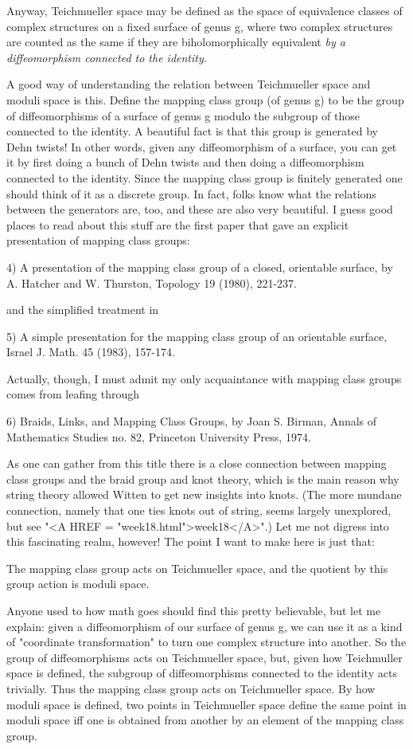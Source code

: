 Anyway, Teichmueller space may be defined as the space of equivalence
classes of complex structures on a fixed surface of genus g, where two
complex structures are counted as the same if they are biholomorphically
equivalent \emph{by a diffeomorphism connected to the identity}.  

A good way of understanding the relation between Teichmueller space and
moduli space is this.  Define the mapping class group (of genus g) to be
the group of diffeomorphisms of a surface of genus g modulo the subgroup
of those connected to the identity.     A beautiful fact is that this
group is generated by Dehn twists!  In other words, given any
diffeomorphism of a surface, you can get it by first doing a bunch of
Dehn twists and then doing a diffeomorphism connected to the identity.  
Since the mapping class group is finitely generated one should think of
it as a discrete group.  In fact, folks know what the relations between
the generators are, too, and these are also very beautiful.  I guess
good places to read about this stuff are the first paper that gave an
explicit presentation of mapping class groups:

4) A presentation of the mapping class group of a closed, orientable
surface, by A. Hatcher and W. Thurston, Topology 19 (1980), 221-237.

and the simplified treatment in 

5) A simple presentation for the mapping class group of an orientable
surface, Israel J. Math. 45 (1983), 157-174.

Actually, though, I must admit my only acquaintance with mapping class
groups comes from leafing through

6) Braids, Links, and Mapping Class Groups, by Joan S. Birman, Annals of
Mathematics Studies no. 82, Princeton University Press, 1974. 

As one can gather from this title there is a close connection between
mapping class groups and the braid group and knot theory, which is the
main reason why string theory allowed Witten to get new insights into
knots.  (The more mundane connection, namely that one ties knots out of
string, seems largely unexplored, but see "<A HREF = "week18.html">week18</A>".)  Let me not digress
into this fascinating realm, however!  The point I want to make here is
just that:

The mapping class group acts on Teichmueller space, and the quotient by
this group action is moduli space.

Anyone used to how math goes should find this pretty believable, but let
me explain: given a diffeomorphism of our surface of genus g, we can use
it as a kind of "coordinate transformation" to turn one complex
structure into another.  So the group of diffeomorphisms acts on
Teichmueller space, but, given how Teichmuller space is defined, the
subgroup of diffeomorphisms connected to the identity acts trivially.
Thus the mapping class group acts on Teichmueller space.  By how moduli
space is defined, two points in Teichmueller space define the same point
in moduli space iff one is obtained from another by an element of the
mapping class group.  

